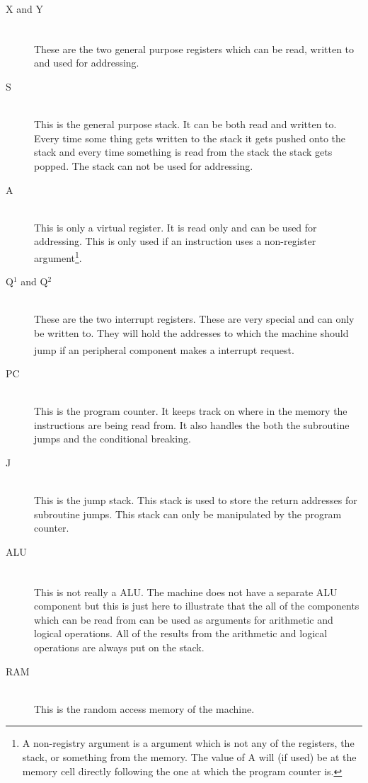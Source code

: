 \documentclass{article}
\begin{document}
\begin{description}
  \item[X and Y] \hfill \\
  These are the two general purpose registers\textsuperscript{\cite{register}}
  which can be read, written to and used for addressing.
  \item[S] \hfill \\
  This is the general purpose stack. It can be both read and
  written to. Every time some thing gets written to the stack it gets pushed onto the
  stack and every time something is read from the stack the stack gets popped.
  The stack can not be used for addressing.
  \item[A] \hfill \\
  This is only a virtual register. It is read only and can be used for
  addressing. This is only used if an instruction uses a non-register
  argument\footnote{A non-registry argument is a argument which is not any of
  the registers, the stack, or something from the memory. The value of A will
  (if used) be at the memory cell directly following the one at which the
  program counter is.}.
  \item[Q$^1$ and Q$^2$] \hfill \\
  These are the two interrupt registers. These are very special and can only be
  written to. They will hold the addresses to which the machine should jump if an
  peripheral component makes a interrupt request\textsuperscript{\cite{irq}}.

  \item[PC]\hfill \\
  This is the program counter. It keeps track on where in the memory the
  instructions are being read from. It also handles the both the subroutine
  jumps and the conditional breaking.
  \item[J]\hfill \\
  This is the jump stack. This stack is used to store the return addresses for
  subroutine jumps. This stack can only be manipulated by the program counter.
  \item[ALU]\hfill \\
  This is not really a ALU\textsuperscript{\cite{alu}}. The machine does not
  have a separate ALU component but this is just here to illustrate that the all of the components which can
  be read from can be used as arguments for arithmetic and logical operations.
  All of the results from the arithmetic and logical operations are always put
  on the stack.
  \item[RAM]\hfill \\
  This is the random access memory of the machine.
\end{description}
\end{document}
